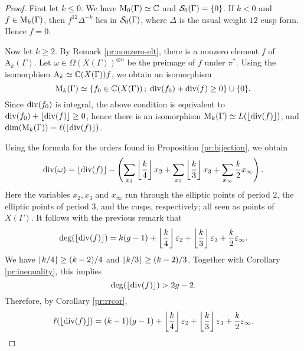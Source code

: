 \begin{proof}
 First let $k\leq 0$. We have $\mathrm{M}_0(\Gamma)\simeq\mathbb{C}$ and $\mathcal{S}_0(\Gamma)=\{0\}$. If $k<0$ and $f\in\mathrm{M}_{k}(\Gamma)$, then $f^{12}\Delta^{-k}$ lies in $\mathcal{S}_0(\Gamma)$, where $\Delta$ is the usual weight $12$ cusp form. Hence $f=0$.
 
 Now let $k\geq 2$. By Remark \ref{pr:nonzero-elt}, there is a nonzero element $f$ of $\mathrm{A}_k(\Gamma)$. Let $\omega\in\Omega(X(\Gamma))^{\otimes n}$ be the preimage of $f$ under $\pi^*$. Using the isomorphism $\mathrm{A}_k\simeq\mathbb{C}(X(\Gamma))f$, we obtain an isomorphism
 \[
 \mathrm{M}_k(\Gamma)\simeq\{f_0\in\mathbb{C}(X(\Gamma))\,;\; \operatorname{div}(f_0)+\operatorname{div}(f)\geq 0\} \cup \{0\}.
 \]
 Since $\operatorname{div}(f_0)$ is integral, the above condition is equivalent to $\operatorname{div}(f_0)+\left \lfloor \operatorname{div}(f) \right\rfloor\geq 0$, hence there is an isomorphism $\mathrm{M}_{k}(\Gamma)\simeq L(\left \lfloor \operatorname{div}(f) \right\rfloor)$, and $\dim(\mathrm{M}_k(\Gamma))=\ell(\left \lfloor \operatorname{div}(f) \right\rfloor)$.
 
 Using the formula for the orders found in Proposition \ref{pr:bijection}, we obtain
 \[
  \operatorname{div}(\omega)=\left \lfloor \operatorname{div}(f) \right\rfloor-\left(\sum_{x_2}\left \lfloor \frac{k}{4} \right\rfloor x_{2}+\sum_{x_{3}}\left \lfloor \frac{k}{3} \right\rfloor x_3+\sum_{x_{\infty}}\frac{k}{2}x_{\infty}\right).
 \]
 Here the variables $x_2, x_3$ and $x_\infty$ run through the elliptic points of period $2$, the elliptic points of period $3$, and the cusps, respectively; all seen as points of $X(\Gamma)$. It follows with the previous remark that
 \[
  \deg(\left \lfloor \operatorname{div}(f) \right\rfloor)=k(g-1) + \left \lfloor \frac{k}{4} \right\rfloor\varepsilon_2 + \left \lfloor \frac{k}{3} \right\rfloor\varepsilon_3 + \frac{k}{2}\varepsilon_\infty.
 \]
 We have $\left \lfloor k/4 \right\rfloor\geq(k-2)/4$ and $\left \lfloor k/3 \right\rfloor\geq(k-2)/3$. Together with Corollary \ref{pr:inequality}, this implies
 \[
  \deg(\left \lfloor \operatorname{div}(f) \right\rfloor)>2g-2.
 \]
 Therefore, by Corollary \ref{pr:rrcor},
 \[
  \ell(\left \lfloor \operatorname{div}(f) \right\rfloor)=(k-1)(g-1) + \left \lfloor \frac{k}{4} \right\rfloor\varepsilon_2 + \left \lfloor \frac{k}{3} \right\rfloor\varepsilon_3 + \frac{k}{2}\varepsilon_\infty.
 \]
 
\end{proof}

